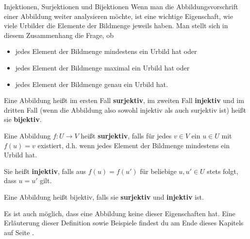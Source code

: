\documentclass[../../main.tex]{subfiles}
\begin{document}
\fussy
\begin{advanced}{Injektionen, Surjektionen und Bijektionen}
    Wenn man die Abbildungsvorschrift einer Abbildung weiter analysieren möchte, ist eine wichtige Eigenschaft, wie viele Urbilder die Elemente der Bildmenge jeweils haben. Man stellt sich in diesem Zusammenhang die Frage, ob
    \begin{itemize}[noitemsep]
        \item jedes Element der Bildmenge mindestens ein Urbild hat oder
        \item jedes Element der Bildmenge maximal ein Urbild hat oder
        \item jedes Element der Bildmenge genau ein Urbild hat.
    \end{itemize}
    
    Eine Abbildung heißt im ersten Fall \textbf{surjektiv}, im zweiten Fall \textbf{injektiv} und im dritten Fall (wenn die Abbildung also sowohl injektiv als auch surjektiv ist) heißt sie \textbf{bijektiv}.
    
    \begin{definition}
        Eine Abbildung $f\colon U\rightarrow V$ heißt \textbf{surjektiv}, falls für jedes $v\in V$ ein $u\in U$ mit $f(u)=v$ existiert, d.h. wenn jedes Element der Bildmenge mindestens ein Urbild hat.
        
        Sie heißt \textbf{injektiv}, falls aus $f(u)=f(u')$ für beliebige $u,u'\in U$ stets folgt, dass $u=u'$ gilt. 
        
        Eine Abbildung heißt bijektiv, falls sie \textbf{surjektiv} und \textbf{injektiv} ist.
    \end{definition}
    
    Es ist auch möglich, dass eine Abbildung keine dieser Eigenschaften hat.
    Eine Erläuterung dieser Definition sowie Beispiele findest du am Ende dieses Kapitels auf Seite \pageref{advanced:bijektion}.
\end{advanced}
\end{document}

